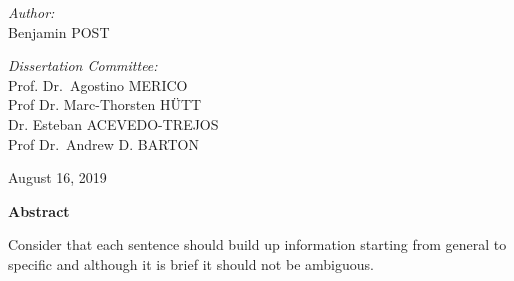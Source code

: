 \begin{titlepage}
\begin{center}
\vspace{3 cm}
\begin{minipage}{0.4\textwidth}
\begin{flushleft} 
\emph{Author:}\\
Benjamin \MakeUppercase{Post}
\end{flushleft}
\end{minipage}
\begin{minipage}{0.4\textwidth}
\begin{flushright} 
\emph{Dissertation Committee:} \\
Prof. Dr.~Agostino \MakeUppercase{Merico}\\
Prof Dr. Marc-Thorsten \MakeUppercase{Hütt}\\
Dr. Esteban \MakeUppercase{Acevedo-Trejos}\\
Prof Dr.~Andrew D. \MakeUppercase{Barton}\\
\end{flushright}
\end{minipage}

\vspace{2cm}

{August 16, 2019 }

\end{center}


\large 
\textbf{Abstract} \\

\normalsize


Consider that each sentence should build up information starting from general to specific and although it is brief it should not be ambiguous.


\end{titlepage}
